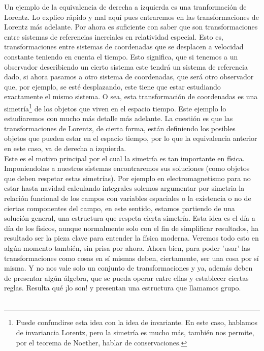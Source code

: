 \documentclass[12pt]{article}
\begin{document}
Un ejemplo de la equivalencia de derecha a izquierda es una tranformación de Lorentz. Lo explico rápido y mal aquí pues entraremos en las transformaciones de Lorentz más adelante. Por ahora es suficiente con saber que son transformaciones entre sistemas de referencias inerciales en relatividad especial. Esto es, transformaciones entre sistemas de coordenadas que se desplacen a velocidad constante teniendo en cuenta el tiempo. Esto significa, que si tenemos a un observador describiendo un cierto sistema este tendrá un sistema de referencia dado, si ahora pasamos a otro sistema de coordenadas, que será otro observador que, por ejemplo, se esté desplazando, este tiene que estar estudiando exactamente el mismo sistema. O sea, esta transformación de coordenadas es una simetría\footnote{Puede confundirse esta idea con la idea de invariante. En este caso, hablamos de invariancia Lorentz, pero la simetría es mucho más, también nos permite, por el teorema de Noether, hablar de conservaciones. } de los objetos que viven en el espacio tiempo. Este ejemplo lo estudiaremos con mucho más detalle más adelante. La cuestión es que las transformaciones de Lorentz, de cierta forma, están definiendo los posibles objetos que pueden estar en el espacio tiempo, por lo que la equivalencia anterior en este caso, va de derecha a izquierda. \\ 
Este es el motivo principal por el cual la simetría es tan importante en física. Imponiendolas a nuestros sistemas encontraremos sus soluciones (como objetos que deben respetar estas simetrías). Por ejemplo en electromagnetismo para no estar hasta navidad calculando integrales solemos argumentar por simetria la relación funcional de los campos con variables espaciales o la existencia o no de ciertas componentes del campo, en este sentido, estamos partiendo de una solución general, una estructura que respeta cierta simetría. Esta idea es el día a día de los físicos, aunque normalmente solo con el fin de simplificar resultados, ha resultado ser la pieza clave para entender la física moderna. Veremos todo esto en algún momento también, sin prisa por ahora. Ahora bien, para poder 'usar' las transformaciones como cosas en sí mismas deben, ciertamente, ser una cosa por sí misma. Y no nos vale solo un conjunto de transformaciones y ya, además deben de presentar algún álgebra, que se pueda operar entre ellas y establecer ciertas reglas. Resulta qué ¡lo son! y presentan una estructura que llamamos grupo.\\\\
\end{document}
